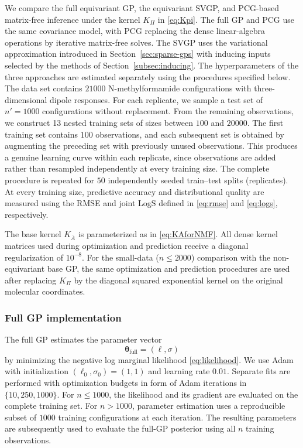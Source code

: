 \documentclass[11pt,a4paper]{article}
\newcommand{\btheta}{\boldsymbol{\theta}}
\begin{document}
We compare the full equivariant GP, the equivariant SVGP, and PCG-based matrix-free inference under the kernel $K_\Pi$ in \eqref{eq:Kpi}. The full GP and PCG use the same covariance model, with PCG replacing the dense linear-algebra operations by iterative matrix-free solves. The SVGP uses the variational approximation introduced in Section~\ref{sec:sparse-gps} with inducing inputs selected by the methods of Section~\ref{subsec:inducing}. The hyperparameters of the three approaches are estimated separately using the procedures specified below. The data set contains $21000$ N-methylformamide configurations with three-dimensional dipole responses. For each replicate, we sample a test set of $n'=1000$ configurations without replacement. From the remaining observations, we construct 13 nested training sets of sizes between $100$ and $20000.$ The first training set contains $100$ observations, and each subsequent set is obtained by augmenting the preceding set with previously unused observations. This produces a genuine learning curve within each replicate, since observations are added rather than resampled independently at every training size. The complete procedure is repeated for $50$ independently seeded train--test splits (replicates). At every training size, predictive accuracy and distributional quality are measured using the RMSE and joint LogS defined in \eqref{eq:rmse} and \eqref{eq:logs}, respectively.

The base kernel $K_{\bar A}$ is parameterized as in \eqref{eq:KAforNMF}. All dense kernel matrices used during optimization and prediction receive a diagonal regularization of $10^{-8}.$  For the small-data ($n\leq2000$) comparison with the non-equivariant base GP, the same optimization and prediction procedures are used after replacing $K_\Pi$ by the diagonal squared exponential kernel on the original molecular coordinates. 
\subsubsection{Full GP implementation}
The full GP estimates the parameter vector
\begin{equation*}
\btheta_{\mathrm{full}}=(\ell,\sigma)
\end{equation*} by minimizing the negative log marginal likelihood \eqref{eq:likelihood}. We use Adam with initialization $(\ell_0,\sigma_0)=(1,1)$ and learning rate $0.01$. Separate fits are performed with optimization budgets in form of Adam iterations in $\{10,250,1000\}.$ For $n\leq1000$, the likelihood and its gradient are evaluated on the complete training set. For $n>1000$, parameter estimation uses a reproducible subset of $1000$ training configurations at each iteration. The resulting parameters are subsequently used to evaluate the full-GP posterior using all $n$ training observations. 
\end{document}
